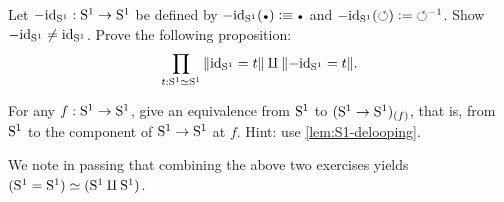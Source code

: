 \begin{xca}\label{xca:S1=S1-components}
Let $-\id_\Sc : \Sc\to\Sc$ be defined by $-\id_\Sc(\base)\defeq\base$ 
and $-\id_\Sc(\Sloop)\defis{\Sloop}^{-1}$. Show $-\id_\Sc \neq \id_\Sc$.
Prove the following proposition:
\[
\prod_{t:\Sc\equiv\Sc}{\Trunc{\id_\Sc = t}\amalg \Trunc{-\id_\Sc = t}}.
\]
\end{xca}

\begin{xca}\label{xca:(S1->S1)_(f)-eqv-S1}
For any $f: \Sc\to\Sc$, give an equivalence
from $\Sc$ to $(\Sc\to\Sc)_{(f)}$, that is, from $\Sc$ to
the component of $\Sc\to\Sc$ at $f$.
Hint: use \cref{lem:S1-delooping}.
\end{xca}

We note in passing that combining the above two exercises 
yields $(\Sc=\Sc)\equiv(\Sc\amalg\Sc)$.

